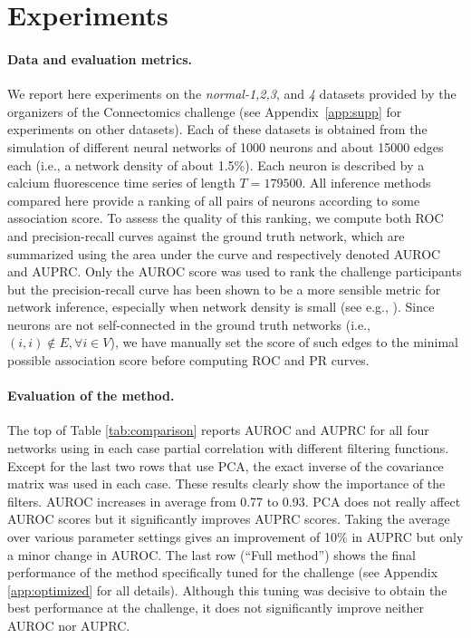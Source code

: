 \documentclass[wcp]{jmlr}
\begin{document}
\section{Experiments} \label{sec:results}


\paragraph{Data and evaluation metrics.}

We report here experiments on the \textit{normal-1,2,3}, and \textit{4}
datasets provided by the organizers of the Connectomics challenge (see
Appendix~\ref{app:supp} for experiments on other datasets). Each of
these datasets is obtained from the simulation \citep{stetter2012model} of
different neural networks of 1000 neurons and about 15000 edges each (i.e., a
network density of about 1.5\%). Each neuron is described by a calcium
fluorescence time series of length $T=179500$. All inference methods compared
here provide a ranking of all pairs of neurons according to some association score. To assess the quality of this ranking, we compute both ROC and
precision-recall curves against the ground truth network, which are summarized
using the area under the curve and respectively  denoted AUROC and AUPRC. Only
the AUROC score was used to rank the challenge participants but the precision-recall curve has been shown to be a more sensible metric for network
inference, especially when network density is small (see e.g.,
\cite{schrynemackers2013protocols}). Since neurons are not self-connected in
the ground truth networks (i.e., $(i, i) \not \in E, \forall i \in V$), we
have manually set the score of such edges to the minimal possible association
score before computing ROC and PR curves.

\paragraph{Evaluation of the method.}

The top of Table \ref{tab:comparison} reports AUROC and AUPRC for all
four networks using in each case partial correlation with different
filtering functions. Except for the last two rows that use PCA, the
exact inverse of the covariance matrix was used in each case. These
results clearly show the importance of the filters. AUROC increases in
average from 0.77 to 0.93. PCA does not really affect AUROC scores but
it significantly improves AUPRC scores. Taking the average over
various parameter settings gives an improvement of 10\% in AUPRC but
only a minor change in AUROC. The last row (``Full method'') shows the
final performance of the method specifically tuned for the challenge
(see Appendix \ref{app:optimized} for all details). Although this
tuning was decisive to obtain the best performance at the challenge,
it does not significantly improve neither AUROC nor AUPRC.
\end{document}
